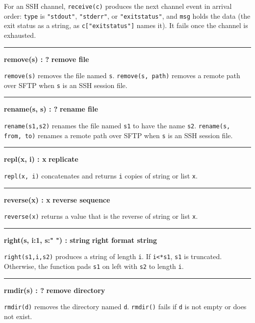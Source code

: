 For an SSH channel, \texttt{receive(c)} produces the next channel
event in arrival order: \texttt{type} is \texttt{"stdout"},
\texttt{"stderr"}, or \texttt{"exitstatus"}, and \texttt{msg} holds the
data (the exit status as a string, as \texttt{c["exitstatus"]} names
it). It fails once the channel is exhausted.

\bigskip\hrule\vspace{0.1cm}
\noindent
{\bf remove(s) : ? } \hfill {\bf remove file}

\noindent
{}\texttt{remove(s)} removes the
file named \texttt{s}. \texttt{remove(s, path)} removes a remote path
over SFTP when \texttt{s} is an SSH session file.

\bigskip\hrule\vspace{0.1cm}
\noindent
{\bf rename(s, s) : ? } \hfill {\bf rename file}

\noindent
{}\texttt{rename(s1,s2)} renames the file named
\texttt{s1} to have the name \texttt{s2}. \texttt{rename(s, from, to)}
renames a remote path over SFTP when \texttt{s} is an SSH session file.

\bigskip\hrule\vspace{0.1cm}
\noindent
{\bf repl(x, i) : x } \hfill {\bf replicate}

\noindent
{}\texttt{repl(x, i)} concatenates and returns
\texttt{i} copies of string or list \texttt{x}.

\bigskip\hrule\vspace{0.1cm}
\noindent
{\bf reverse(x) : x } \hfill {\bf reverse sequence}

\noindent
{}\texttt{reverse(x)} returns a value that is the
reverse of string or list \texttt{x}.

\bigskip\hrule\vspace{0.1cm}
\noindent
{\bf right(s, i:1, s:" ") : string } \hfill {\bf right format string}

\noindent
{}\texttt{right(s1,i,s2)} produces a string of length
\texttt{i}. If \texttt{i{\textless}*s1}, \texttt{s1} is truncated.
Otherwise, the function pads \texttt{s1} on left with \texttt{s2} to
length \texttt{i}.

\bigskip\hrule\vspace{0.1cm}
\noindent
{\bf rmdir(s) : ? } \hfill {\bf remove directory}

\noindent
{}\texttt{rmdir(d)} removes the directory named
\texttt{d}. \texttt{rmdir()} fails if \texttt{d} is not empty or does
not exist.


